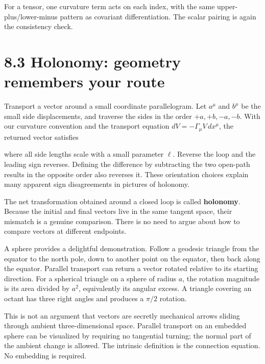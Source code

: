\documentclass[
  11pt,
  letterpaper,
  oneside,
  openany]{scrbook}
\begin{document}
For a tensor, one curvature term acts on each index, with the same
upper-plus/lower-minus pattern as covariant differentiation. The scalar
pairing is again the consistency check.

\hypertarget{holonomy-geometry-remembers-your-route}{%
\section{8.3 Holonomy: geometry remembers your
route}\label{holonomy-geometry-remembers-your-route}}

Transport a vector around a small coordinate parallelogram. Let
\(a^\mu\) and \(b^\mu\) be the small side displacements, and traverse
the sides in the order \(+a,+b,-a,-b\). With our curvature convention
and the transport equation \(dV=-\Gamma_\mu V\,dx^\mu\), the returned
vector satisfies

\begin{center}
\begingroup
{}
\ifdim\wd\grmathbox>\linewidth
\resizebox{\linewidth}{!}{\usebox{\grmathbox}}
\else\usebox{\grmathbox}\fi
\endgroup
\end{center}

where all side lengths scale with a small parameter \(\ell\). Reverse
the loop and the leading sign reverses. Defining the difference by
subtracting the two open-path results in the opposite order also
reverses it. These orientation choices explain many apparent sign
disagreements in pictures of holonomy.

The net transformation obtained around a closed loop is called
\textbf{holonomy}. Because the initial and final vectors live in the
same tangent space, their mismatch is a genuine comparison. There is no
need to argue about how to compare vectors at different endpoints.

A sphere provides a delightful demonstration. Follow a geodesic triangle
from the equator to the north pole, down to another point on the
equator, then back along the equator. Parallel transport can return a
vector rotated relative to its starting direction. For a spherical
triangle on a sphere of radius \(a\), the rotation magnitude is its area
divided by \(a^2\), equivalently its angular excess. A triangle covering
an octant has three right angles and produces a \(\pi/2\) rotation.

This is not an argument that vectors are secretly mechanical arrows
sliding through ambient three-dimensional space. Parallel transport on
an embedded sphere can be visualized by requiring no tangential turning;
the normal part of the ambient change is allowed. The intrinsic
definition is the connection equation. No embedding is required.
\end{document}
